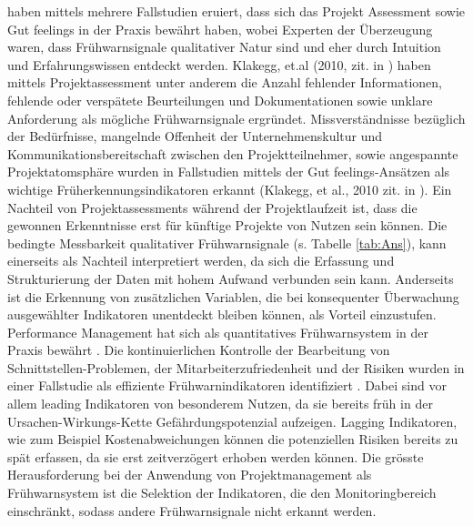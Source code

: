\citealp[S.~59]{haan13} haben mittels mehrere Fallstudien eruiert, dass sich das Projekt Assessment sowie \glqq Gut feelings \grqq{ } in der Praxis bewährt haben, wobei Experten der Überzeugung waren, dass Frühwarnsignale qualitativer Natur sind und eher durch Intuition und Erfahrungswissen entdeckt werden. Klakegg, et.al (2010, zit. in \citealp{haankra13}) haben mittels Projektassessment unter anderem die Anzahl fehlender Informationen, fehlende oder verspätete Beurteilungen und Dokumentationen sowie unklare Anforderung als mögliche Frühwarnsignale ergründet. Missverständnisse bezüglich der Bedürfnisse, mangelnde Offenheit der Unternehmenskultur und Kommunikationsbereitschaft zwischen den Projektteilnehmer, sowie angespannte Projektatomsphäre wurden in Fallstudien mittels der \glqq Gut feelings\grqq{ }-Ansätzen als wichtige Früherkennungsindikatoren erkannt (Klakegg, et al., 2010 zit. in \citealp{haankra13}). Ein Nachteil von Projektassessments während der Projektlaufzeit ist, dass die gewonnen Erkenntnisse erst für künftige Projekte von Nutzen sein können. Die bedingte Messbarkeit qualitativer Frühwarnsignale (s. Tabelle \ref{tab:Ans}), kann einerseits als Nachteil interpretiert werden, da sich die Erfassung und Strukturierung der Daten mit hohem Aufwand verbunden sein kann. Anderseits ist die Erkennung von zusätzlichen Variablen, die bei konsequenter Überwachung ausgewählter Indikatoren unentdeckt bleiben können, als Vorteil einzustufen. Performance Management hat sich als quantitatives Frühwarnsystem in der Praxis bewährt \citealp{haan13}. Die kontinuierlichen Kontrolle der Bearbeitung von Schnittstellen-Problemen, der Mitarbeiterzufriedenheit und der Risiken wurden in einer Fallstudie als effiziente Frühwarnindikatoren identifiziert \citealp{haan13}. Dabei sind vor allem \glqq leading \grqq{ } Indikatoren von besonderem Nutzen, da sie bereits früh in der Ursachen-Wirkungs-Kette Gefährdungspotenzial aufzeigen. \glqq Lagging \grqq Indikatoren, wie zum Beispiel Kostenabweichungen können die potenziellen Risiken bereits zu spät erfassen, da sie erst zeitverzögert erhoben werden können. Die grösste Herausforderung bei der Anwendung von Projektmanagement als Frühwarnsystem ist die Selektion der Indikatoren, die den Monitoringbereich einschränkt, sodass andere Frühwarnsignale nicht erkannt werden.


